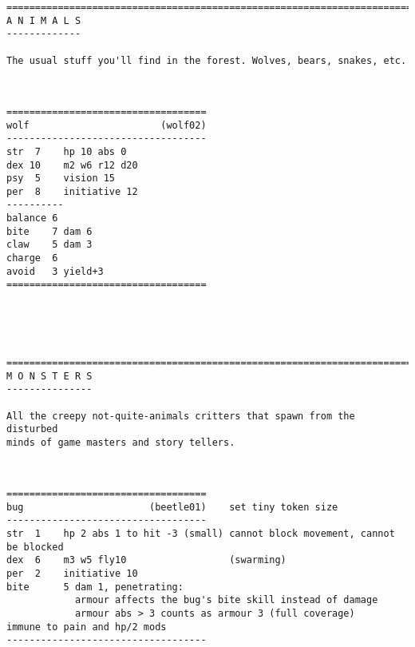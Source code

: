 \pagebreak[1]
\tiny \begin{samepage} \begin{verbatim}
================================================================================
A N I M A L S
-------------

The usual stuff you'll find in the forest. Wolves, bears, snakes, etc.
\end{verbatim} \end{samepage} \normalsize

\

\pagebreak[1]
\tiny \begin{samepage} \begin{verbatim}
===================================
wolf                       (wolf02)
-----------------------------------
str  7    hp 10 abs 0
dex 10    m2 w6 r12 d20
psy  5    vision 15
per  8    initiative 12
----------
balance 6
bite    7 dam 6
claw    5 dam 3
charge  6
avoid   3 yield+3
===================================



\end{verbatim} \end{samepage} \normalsize

\






\pagebreak[2]
\tiny \begin{samepage} \begin{verbatim}
================================================================================
M O N S T E R S
---------------

All the creepy not-quite-animals critters that spawn from the disturbed
minds of game masters and story tellers.
\end{verbatim} \end{samepage} \normalsize

\

\pagebreak[1]
\tiny \begin{samepage} \begin{verbatim}
===================================
bug                      (beetle01)    set tiny token size
-----------------------------------
str  1    hp 2 abs 1 to hit -3 (small) cannot block movement, cannot be blocked
dex  6    m3 w5 fly10                  (swarming)
per  2    initiative 10
bite      5 dam 1, penetrating:
            armour affects the bug's bite skill instead of damage
            armour abs > 3 counts as armour 3 (full coverage)
immune to pain and hp/2 mods
-----------------------------------
\end{verbatim} \end{samepage} \normalsize

